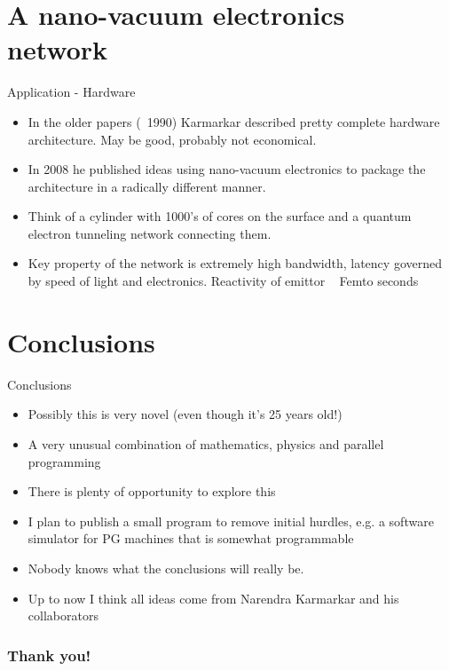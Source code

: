 \documentclass{beamer}
\begin{document}
\section{A nano-vacuum electronics network}

\begin{frame}{Application - Hardware}
\begin{itemize}
\item
In the older papers (~1990) Karmarkar described pretty complete hardware architecture.  May be good, probably not economical.
\item
In 2008 he published ideas using nano-vacuum electronics to package the architecture in a radically different manner.
\item
Think of a cylinder with 1000's of cores on the surface and a quantum electron tunneling network connecting them.
\item
Key property of the network is extremely high bandwidth, latency governed by speed of light and electronics. Reactivity of emittor ~ Femto seconds
\end{itemize}
\end{frame}




\section{Conclusions}
\begin{frame}{Conclusions}
\begin{itemize}
\item Possibly this is very novel (even though it's 25 years old!)
\item A very unusual combination of mathematics, physics and parallel programming
\item There is plenty of opportunity to explore this
\item I plan to publish a small program to remove initial hurdles, e.g. a software simulator for PG machines that is somewhat programmable
\item Nobody knows what the conclusions will really be.
\item Up to now I think all ideas come from Narendra Karmarkar and his collaborators
\end{itemize}
\end{frame}


\begin{frame}
  \frametitle{Thank you!}
\end{frame}
\end{document}
